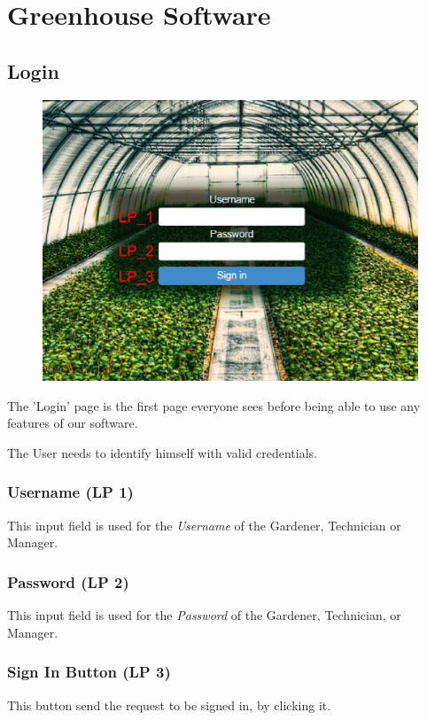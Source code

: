 \chapter{Greenhouse Software}
\label{chap:appendix_AllUser}


\section{Login}
\label{sec:appendix_SignIn}
\begin{figure}
\includegraphics[width=1\textwidth]{images/appendix_images/SignIn.eps}
\end{figure}

The 'Login' page is the first page everyone sees before being able to use any
features of our software.

The User needs to identify himself with valid credentials.
 
\subsection{Username (LP 1)}
This input field is used for the \emph{Username} of the Gardener, Technician or
Manager.

\subsection{Password (LP 2)}
This input field is used for the \emph{Password} of the Gardener, Technician, or
Manager.

\subsection{Sign In Button (LP 3)}
This button send the request to be signed in, by clicking it.

